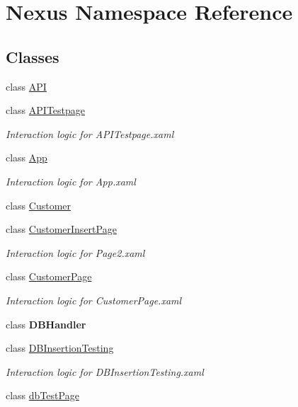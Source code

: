 \hypertarget{namespace_nexus}{}\section{Nexus Namespace Reference}
\label{namespace_nexus}
\subsection*{Classes}
\begin{DoxyCompactItemize}
\item 
class \mbox{\hyperlink{class_nexus_1_1_a_p_i}{A\+PI}}
\item 
class \mbox{\hyperlink{class_nexus_1_1_a_p_i_testpage}{A\+P\+I\+Testpage}}
\begin{DoxyCompactList}\small\item\em Interaction logic for A\+P\+I\+Testpage.\+xaml \end{DoxyCompactList}\item 
class \mbox{\hyperlink{class_nexus_1_1_app}{App}}
\begin{DoxyCompactList}\small\item\em Interaction logic for App.\+xaml \end{DoxyCompactList}\item 
class \mbox{\hyperlink{class_nexus_1_1_customer}{Customer}}
\item 
class \mbox{\hyperlink{class_nexus_1_1_customer_insert_page}{Customer\+Insert\+Page}}
\begin{DoxyCompactList}\small\item\em Interaction logic for Page2.\+xaml \end{DoxyCompactList}\item 
class \mbox{\hyperlink{class_nexus_1_1_customer_page}{Customer\+Page}}
\begin{DoxyCompactList}\small\item\em Interaction logic for Customer\+Page.\+xaml \end{DoxyCompactList}\item 
class {\bfseries D\+B\+Handler}
\item 
class \mbox{\hyperlink{class_nexus_1_1_d_b_insertion_testing}{D\+B\+Insertion\+Testing}}
\begin{DoxyCompactList}\small\item\em Interaction logic for D\+B\+Insertion\+Testing.\+xaml \end{DoxyCompactList}\item 
class \mbox{\hyperlink{class_nexus_1_1db_test_page}{db\+Test\+Page}}

\end{DoxyCompactItemize}

